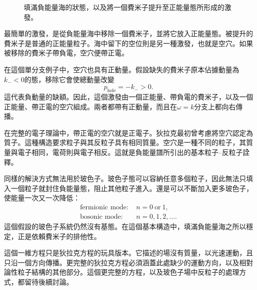 \begin{figure}
\centering
{}
\caption{填滿負能量海的狀態，以及將一個費米子提升至正能量態所形成的激發。}
\end{figure}

最簡單的激發，是從負能量海中移除一個費米子，並將它放入正能量態。被提升的費米子是普通的正能量粒子。海中留下的空位則是另一種激發，也就是空穴。如果被移除的費米子帶負電，空穴便帶正電。

在這個單分支例子中，空穴也具有正動量。假設缺失的費米子原本佔據動量為\(k_-<0\)的態，移除它會使總動量改變
\begin{equation}
p_{\mathrm{hole}}=-k_->0.
\end{equation}
這代表負動量的缺額。因此，這個激發由一個正能量、帶負電的費米子，以及一個正能量、帶正電的空穴組成。兩者都帶有正動量，而且在\(\omega=k\)分支上都向右傳播。

在完整的電子理論中，帶正電的空穴就是正電子。狄拉克最初曾考慮將空穴認定為質子。這種構造要求粒子與其反粒子具有相同質量。空穴是一種不同的粒子，其質量與電子相同，電荷則與電子相反。這就是負能量譜所引出的基本粒子--反粒子詮釋。

同樣的解決方式無法用於玻色子。玻色子態可以容納任意多個粒子，因此無法只填入一個粒子就封住負能量態，阻止其他粒子進入。還是可以不斷加入更多玻色子，使能量一次又一次降低：
\begin{equation}
\begin{aligned}
\text{fermionic mode: }&n=0\ \text{or}\ 1,\\
\text{bosonic mode: }&n=0,1,2,\ldots .
\end{aligned}
\end{equation}
這個假設的玻色子系統仍然沒有基態。在這個基本構造中，填滿負能量海之所以穩定，正是依賴費米子的排他性。

這個一維方程只是狄拉克方程的玩具版本。它描述的場沒有質量，以光速運動，且只沿一個方向傳播。更完整的狄拉克方程必須涵蓋此處缺少的運動方向，以及相對論性粒子結構的其他部分。這個更完整的方程，以及玻色子場中反粒子的處理方式，都留待後續討論。
